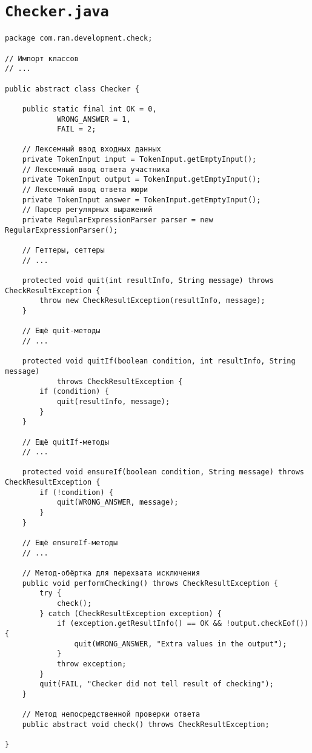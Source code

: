 \section*{\texttt{Checker.java}}
\begin{verbatim}
package com.ran.development.check;

// Импорт классов
// ...

public abstract class Checker {

    public static final int OK = 0,
            WRONG_ANSWER = 1,
            FAIL = 2;

    // Лексемный ввод входных данных
    private TokenInput input = TokenInput.getEmptyInput();
    // Лексемный ввод ответа участника
    private TokenInput output = TokenInput.getEmptyInput();
    // Лексемный ввод ответа жюри
    private TokenInput answer = TokenInput.getEmptyInput();
    // Парсер регулярных выражений
    private RegularExpressionParser parser = new RegularExpressionParser();

    // Геттеры, сеттеры
    // ...

    protected void quit(int resultInfo, String message) throws CheckResultException {
        throw new CheckResultException(resultInfo, message);
    }

    // Ещё quit-методы
    // ...

    protected void quitIf(boolean condition, int resultInfo, String message)
            throws CheckResultException {
        if (condition) {
            quit(resultInfo, message);
        }
    }

    // Ещё quitIf-методы
    // ...

    protected void ensureIf(boolean condition, String message) throws CheckResultException {
        if (!condition) {
            quit(WRONG_ANSWER, message);
        }
    }

    // Ещё ensureIf-методы
    // ...

    // Метод-обёртка для перехвата исключения
    public void performChecking() throws CheckResultException {
        try {
            check();
        } catch (CheckResultException exception) {
            if (exception.getResultInfo() == OK && !output.checkEof()) {
                quit(WRONG_ANSWER, "Extra values in the output");
            }
            throw exception;
        }
        quit(FAIL, "Checker did not tell result of checking");
    }

    // Метод непосредственной проверки ответа
    public abstract void check() throws CheckResultException;

}
\end{verbatim}

